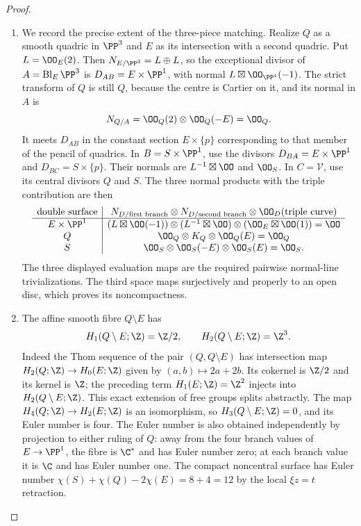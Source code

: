 \begin{proof}
\begin{enumerate}[label=\arabic*.,leftmargin=*]
\item We record the precise extent of the three-piece matching.
Realize $Q$ as a smooth quadric in $\PP^3$ and $E$ as its
intersection with a second quadric.  Put $L=\OO_E(2)$.
Then $N_{E/\PP^3}=L\oplus L$, so the exceptional divisor
of $A=\operatorname{Bl}_E\PP^3$ is
$D_{AB}=E\times\PP^1$, with normal
$L\boxtimes\OO_{\PP^1}(-1)$.
The strict transform of $Q$ is still $Q$, because the centre is
Cartier on it, and its normal in $A$ is
\[
 N_{Q/A}=\OO_Q(2)\otimes\OO_Q(-E)=\OO_Q.
\]
It meets $D_{AB}$ in the constant section $E\times\{p\}$
corresponding to that member of the pencil of quadrics.
In $B=S\times\PP^1$, use the divisors
$D_{BA}=E\times\PP^1$ and $D_{BC}=S\times\{p\}$.
Their normals are $L^{-1}\boxtimes\OO$ and $\OO_S$.
In $C=\mathcal V$, use its central divisors $Q$ and $S$.
The three normal products with the triple contribution are then
\[
\begin{array}{c|c}
 \text{double surface}&
 N_{D/\text{first branch}}\otimes
 N_{D/\text{second branch}}\otimes\OO_D(\text{triple curve})\\ \hline
 E\times\PP^1&
 (L\boxtimes\OO(-1))\otimes(L^{-1}\boxtimes\OO)
       \otimes(\OO_E\boxtimes\OO(1))=\OO\\
 Q&\OO_Q\otimes K_Q\otimes\OO_Q(E)=\OO_Q\\
 S&\OO_S\otimes\OO_S(-E)\otimes\OO_S(E)=\OO_S.
\end{array}
\]
The three displayed evaluation maps are the required pairwise
normal-line trivializations. The third space maps surjectively and
properly to an open disc, which proves its noncompactness.

\item The affine smooth fibre $Q\setminus E$ has
\[
 H_1(Q\setminus E;\Z)=\Z/2,\qquad
 H_2(Q\setminus E;\Z)=\Z^3.
\]
Indeed the Thom sequence of the pair $(Q,Q\setminus E)$ has
intersection map $H_2(Q;\Z)\to H_0(E;\Z)$ given by
$(a,b)\mapsto2a+2b$.  Its cokernel is $\Z/2$ and its
kernel is $\Z$; the preceding term $H_1(E;\Z)=\Z^2$
injects into $H_2(Q\setminus E;\Z)$.
This exact extension of free groups splits abstractly.
The map $H_4(Q;\Z)\to H_2(E;\Z)$ is an isomorphism,
so $H_3(Q\setminus E;\Z)=0$, and its Euler number is four.
The Euler number is also obtained independently by projection
to either ruling of $Q$: away from the four branch values of
$E\to\PP^1$, the fibre is $\C^*$ and has Euler number zero;
at each branch value it is $\C$ and has Euler number one.
The compact noncentral surface has Euler number
$\chi(S)+\chi(Q)-2\chi(E)=8+4=12$ by the local $\xi z=t$ retraction.
\end{enumerate}
\end{proof}
